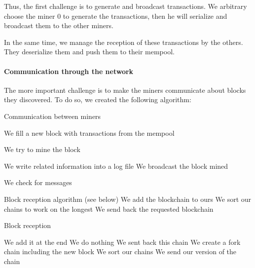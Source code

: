 Thus, the first challenge is to generate and broadcast transactions. We arbitrary choose the miner 0 to generate the transactions, then he will serialize and broadcast them to the other miners.

In the same time, we manage the reception of these transactions by the others. They deserialize them and push them to their mempool. \newline

\paragraph{Communication through the network}

The more important challenge is to make the miners communicate about blocks they discovered. To do so, we created the following algorithm:

\clearpage

\begin{algorithm}
  \caption{Communication between miners}
  \begin{algorithmic}

      \STATE We fill a new block with transactions from the mempool

        \STATE We try to mine the block

          \STATE We write related information into a log file
          \STATE We broadcast the block mined
        \ENDIF

        \STATE We check for messages

          \STATE Block reception algorithm (see below)
          \STATE We add the blockchain to ours
          \STATE We sort our chains to work on the longest
          \STATE We send back the requested blockchain
        \ENDIF

      \ENDWHILE
    \ENDWHILE
  \end{algorithmic}
\end{algorithm}

\begin{algorithm}
  \caption{Block reception}

  \begin{algorithmic}
        \STATE We add it at the end
        \STATE We do nothing
      \ELSE
            \STATE We sent back this chain
            \STATE We create a fork chain including the new block
            \STATE We sort our chains
            \STATE We send our version of the chain
          \ENDIF
        \ENDFOR
      \ENDIF
    \ENDFOR

  \end{algorithmic}

\end{algorithm}


